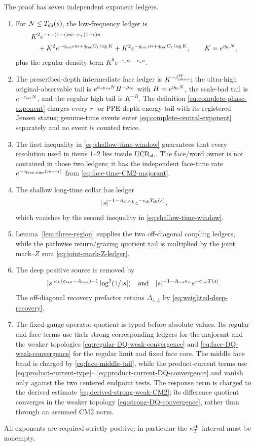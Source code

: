 \documentclass[11pt]{article}
\begin{document}
The proof has seven independent exponent ledgers.
\begin{enumerate}[label=\textup{(A\arabic*)}]
\item For $N\le T_{\rm sh}(s)$, the low-frequency ledger is
\begin{align*}
 &K^2e^{-c_-(1-\epsilon)m-c_+(1-\epsilon)n}\\
 &\quad+K^2e^{-q_{\rm rec}\epsilon m+q_{\rm rec}C_1\log K}
 +K^2e^{-q_{\rm rec}\epsilon n+q_{\rm rec}C_1\log K},
 \qquad K=e^{\eta_{\rm lo}N},
\end{align*}
plus the regular-density term $K^6e^{-c_-m-c_+n}$.
\item The prescribed-depth intermediate face ledger is
$K^{-\beta_{\rm phase}^{W}}$; the ultra-high original-observable tail is
$e^{a_{\rm ultra}N}H^{-\rho_\infty}$ with
$H=e^{\eta_{\rm hi}N}$, the scale-bad tail is $e^{-c_{\rm scl}N}$, and the
regular high tail is $K^{-R}$.  The definition
\eqref{eq:complete-phase-exponent} charges every $r$- or PPE-depth energy
tail with its registered Jensen status; genuine-time events enter
\eqref{eq:complete-central-exponent} separately and no event is counted
twice.
\item The first inequality in \eqref{eq:shallow-time-window} guarantees
that every resolution used in items 1--2 lies inside
$\mathrm{UCR}_{\rm sh}$.
The face/word owner is not contained in those two ledgers; it has the
independent face-time rate
$e^{-c_{\rm face,time}(m+n)}$ from
\eqref{eq:face-time-CM2-majorant}.
\item The shallow long-time collar has ledger
\[
 |s|^{-1-A_{\rm sh}\kappa_L}
 e^{-c_{\rm sh}T_{\rm sh}(s)},
\]
which vanishes by the second inequality in
\eqref{eq:shallow-time-window}.
\item Lemma~\ref{lem:three-region} supplies the two off-diagonal coupling
ledgers, while the pathwise return/grazing quotient tail is multiplied by
the joint mark--$Z$ sum \eqref{eq:joint-mark-Z-ledger}.
\item The deep positive source is removed by
\[
 |s|^{\kappa_L(c_{\rm tail}-A_{\rm loss})-1}\log^2(1/|s|)
 \quad\hbox{and}\quad
 |s|^{-1-A_{\rm col}\kappa_L}e^{-c_{\rm col}T(s)}.
\]
The off-diagonal recovery prefactor retains $\Delta_{s,L}$ by
\eqref{eq:weighted-deep-recovery}.
\item The fixed-gauge operator quotient is typed before absolute values.  Its
regular and face terms use their strong corresponding ledgers for the
majorant and the weaker topologies
\eqref{eq:regular-DQ-weak-convergence} and
\eqref{eq:face-DQ-weak-convergence} for the regular limit and fixed face
core.  The middle face band is charged by
\eqref{eq:face-middle-tail}, while the
product-current terms use \eqref{eq:product-current-type}--
\eqref{eq:product-current-DQ-convergence} and vanish only against the two
centered endpoint tests.  The response term is charged to the derived estimate
\eqref{eq:derived-strong-weak-CM2}; its difference quotient converges in the
weaker topology \eqref{eq:strong-DQ-convergence}, rather than through an
assumed CM2 norm.
\end{enumerate}
All exponents are required strictly positive; in particular the
$\kappa_T^{\rm sh}$ interval must be nonempty.
\end{document}
